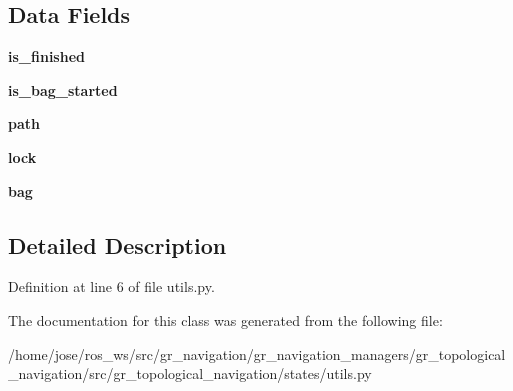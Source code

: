 \subsection*{Data Fields}
\begin{DoxyCompactItemize}
\item 
\mbox{\label{classgr__topological__navigation_1_1states_1_1utils_1_1BagRecorder_aa2595ed3a6dab828fc3773c9fc3e5d88}} 
{\bfseries is\+\_\+finished}
\item 
\mbox{\label{classgr__topological__navigation_1_1states_1_1utils_1_1BagRecorder_ae067a0ac164f2d78fa9014cf183ecd79}} 
{\bfseries is\+\_\+bag\+\_\+started}
\item 
\mbox{\label{classgr__topological__navigation_1_1states_1_1utils_1_1BagRecorder_ab7edcae916489882d7a79604c65680af}} 
{\bfseries path}
\item 
\mbox{\label{classgr__topological__navigation_1_1states_1_1utils_1_1BagRecorder_a9153111d0dfcf5da5cb646718730e996}} 
{\bfseries lock}
\item 
\mbox{\label{classgr__topological__navigation_1_1states_1_1utils_1_1BagRecorder_a24aab1b485ec6418526495c32f60490a}} 
{\bfseries bag}
\end{DoxyCompactItemize}


\subsection{Detailed Description}


Definition at line 6 of file utils.\+py.



The documentation for this class was generated from the following file\+:\begin{DoxyCompactItemize}
\item 
/home/jose/ros\+\_\+ws/src/gr\+\_\+navigation/gr\+\_\+navigation\+\_\+managers/gr\+\_\+topological\+\_\+navigation/src/gr\+\_\+topological\+\_\+navigation/states/utils.\+py\end{DoxyCompactItemize}
